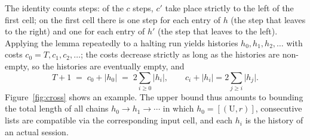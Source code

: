 \documentclass[11pt,a4paper]{amsart}
\theoremstyle{definition}
\theoremstyle{remark}
\newcommand{\U}{\mathrm{U}}
\newcommand{\len}[1]{\lvert #1\rvert}
\begin{document}
The identity counts steps: of the $c$ steps, $c'$ take place strictly to the left of the first cell; on the
first cell there is one step for each entry of $h$ (the step that leaves to the right) and one for each entry
of $h'$ (the step that leaves to the left). Applying the lemma repeatedly to a halting run yields histories
$h_0,h_1,h_2,\dots$ with costs $c_0=T,c_1,c_2,\dots$; the costs decrease strictly as long as the histories are
non-empty, so the histories are eventually empty, and
\begin{equation}\label{eq:time}
T+1 \;=\; c_0+\len{h_0}\;=\;2\sum_{i\ge0}\len{h_i},\qquad c_i+\len{h_i}=2\sum_{j\ge i}\len{h_j}.
\end{equation}
Figure~\ref{fig:cross} shows an example. The upper bound thus amounts to bounding the total length of all
chains $h_0\to h_1\to\cdots$ in which $h_0=[(\U,r)]$, consecutive lists are compatible via the corresponding
input cell, and each $h_i$ is the history of an actual session.
\end{document}
